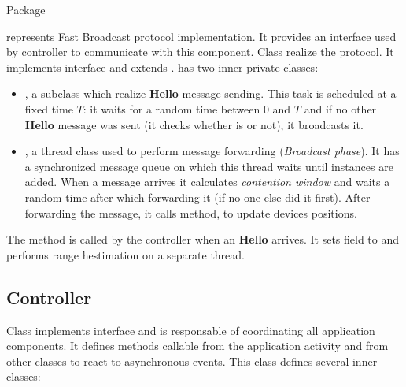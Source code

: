 Package \begin{center}\end{center} represents Fast Broadcast protocol implementation. It provides an interface  used by controller to communicate with this component. Class  realize the protocol. It implements  interface and extends .  has two inner private classes:
\begin{itemize}
	\item {}, a  subclass which realize \textbf{Hello} message sending. This task is scheduled at a fixed time $T$: it waits for a random time between $0$ and $T$ and if no other \textbf{Hello} message was sent (it checks whether  is  or not), it broadcasts it.
	\item {}, a thread class used to perform message forwarding (\textit{Broadcast phase}). It has a synchronized message queue on which this thread waits until  instances are added. When a message arrives it calculates \textit{contention window} and waits a random time after which forwarding it (if no one else did it first). After forwarding the message, it calls  method, to update devices positions.
\end{itemize} 

The method  is called by the controller when an \textbf{Hello} arrives. It sets  field to  and performs range hestimation on a separate thread.

\subsection{Controller}

Class  implements  interface and is responsable of coordinating all application components. It defines methods callable from the application activity and from other classes to react to asynchronous events. This class defines several inner classes:
